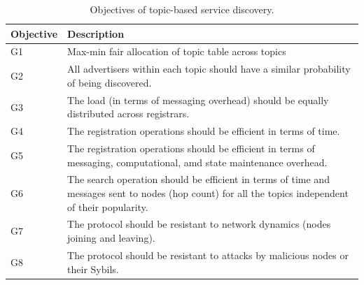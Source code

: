 \begin{table} 
\caption{Objectives of topic-based service discovery.}
\label{tab:objectives}
\renewcommand{\arraystretch}{1.5}
\renewcommand{\tabcolsep}{0.5em}
\centering
\scriptsize{
\begin{tabular} {p{1cm}p{5cm}}
\toprule
\textbf{Objective} & \textbf{Description} \\
\hline
G1 & Max-min fair allocation of topic table across topics \\
\hline
G2 & All advertisers within each topic should have a similar probability of being discovered. \\
\hline
G3 & The load (in terms of messaging overhead) should be equally distributed across registrars. \\
\hline
G4 & The registration operations should be efficient in terms of time. \\
\hline
G5 & The registration operations should be efficient in terms of messaging, computational, amd state maintenance overhead. \\
\hline 
G6 & The search operation should be efficient in terms of time and messages sent to nodes (hop count) for all the topics independent of their popularity. \\
\hline
G7 & The protocol should be resistant to network dynamics (nodes joining and leaving). \\
\hline 
G8 & The protocol should be resistant to attacks by malicious nodes or their Sybils. \\
\hline
\end{tabular}
}
\vspace{-0.2in}
\end{table}


